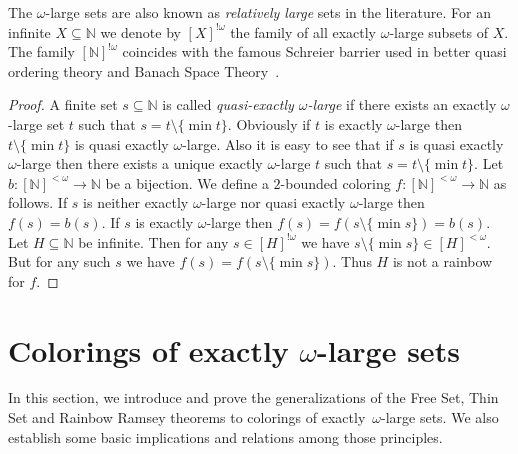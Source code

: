 \documentclass[10pt,a4paper]{article}
\newcommand{\RRT}[0]{\mathsf{RRT}}
\newcommand{\NN}[0]{\mathbb{N}}
\numberwithin{theorem}{section}
\newtheorem{proposition}[theorem]{Proposition}
\begin{document}
The $\omega$-large sets are also known as {\em relatively large} sets in the literature. For an infinite $X\subseteq \NN$ we denote by $[X]^{!\omega}$ the family of all exactly $\omega$-large subsets of $X$.
The family $[\NN]^{!\omega}$ coincides with the famous Schreier barrier used in better quasi ordering theory and Banach Space Theory~\cite{Todorcevic+2010}.


\begin{proof}
A finite set $s \subseteq \NN$ is called {\em quasi-exactly $\omega$-large} if there exists an exactly $\omega$-large set $t$ such that
$s= t \setminus \{\min t\}$. Obviously if $t$ is exactly $\omega$-large then $t\setminus \{\min t\}$ is quasi exactly $\omega$-large. Also it
is easy to see that if $s$ is quasi exactly $\omega$-large then there exists a unique exactly $\omega$-large $t$ such that $s = t \setminus \{\min t\}$.
Let $b:[\NN]^{<\omega} \to \NN$ be a bijection. We define a $2$-bounded coloring $f:[\NN]^{<\omega} \to \NN$ as follows. 
If $s$ is neither exactly $\omega$-large nor quasi exactly $\omega$-large then $f(s) = b(s)$. If $s$ is exactly $\omega$-large then $f(s) = f(s\setminus \{\min s\}) = b(s).$
Let $H\subseteq \NN$ be infinite. Then for any $s \in [H]^{!\omega}$ we have $s\setminus \{\min s\} \in [H]^{<\omega}$. 
But for any such $s$ we have $f(s) = f(s\setminus \{\min s\})$. Thus $H$ is not a rainbow for $f$. 

\end{proof}

\section{Colorings of exactly $\omega$-large sets}\label{sec:fs_ts_rainbow_from_rt}

In this section, we introduce and prove the generalizations of the Free Set, Thin Set and Rainbow Ramsey theorems to colorings of exactly~$\omega$-large sets. We also establish some basic implications and relations among those principles.
\end{document}
